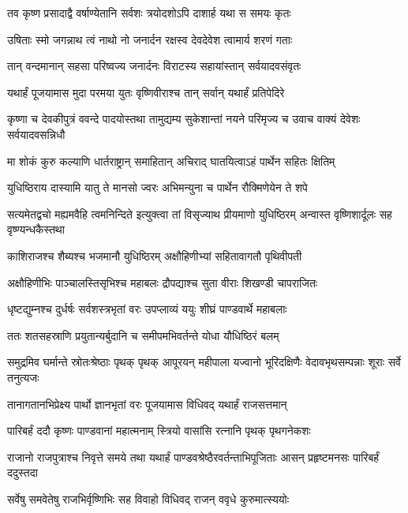 
\twolineshloka
{तव कृष्ण प्रसादाद्वै वर्षाण्येतानि सर्वशः}
{त्रयोदशोऽपि दाशार्ह यथा स समयः कृतः}


\twolineshloka
{उषिताः स्मो जगन्नाथ त्वं नाथो नो जनार्दन}
{रक्षस्व देवदेवेश त्वामार्य शरणं गताः}



\twolineshloka
{तान् वन्दमानान् सहसा परिष्वज्य जनार्दनः}
{विराटस्य सहायांस्तान् सर्वयादवसंवृतः}


\twolineshloka
{यथार्हं पूजयामास मुदा परमया युतः}
{वृष्णिवीराश्च तान् सर्वान् यथार्हं प्रतिपेदिरे}


\threelineshloka
{कृष्णा च देवकीपुत्रं ववन्दे पादयोस्तथा}
{तामुद्यम्य सुकेशान्तां नयने परिमृज्य च}
{उवाच वाक्यं देवेशः सर्वयादवसन्निधौ}


\twolineshloka
{मा शोकं कुरु कल्याणि धार्तराष्ट्रान् समाहितान्}
{अचिराद् घातयित्वाऽहं पार्थेन सहितः क्षितिम्}


\twolineshloka
{युधिष्ठिराय दास्यामि यातु ते मानसो ज्वरः}
{अभिमन्युना च पार्थेन रौक्मिणेयेन ते शपे}


\threelineshloka
{सत्यमेतद्वचो मह्यमवैहि त्वमनिन्दिते}
{इत्युक्त्वा तां विसृज्याथ प्रीयमाणो युधिष्ठिरम्}
{अन्वास्त वृष्णिशार्दूलः सह वृष्ण्यन्धकैस्तथा}


\twolineshloka
{काशिराजश्च शैब्यश्च भजमानौ युधिष्ठिरम्}
{अक्षौहिणीभ्यां सहितावागतौ पृथिवीपती}


\twolineshloka
{अक्षौहिणीभिः पाञ्चालस्तिसृभिश्च महाबलः}
{द्रौपद्याश्च सुता वीराः शिखण्डी चापराजितः}


\twolineshloka
{धृष्टद्युम्नश्च दुर्धर्षः सर्वशस्त्रभृतां वरः}
{उपप्लाव्यं ययुः शीघ्रं पाण्डवार्थे महाबलाः}


\twolineshloka
{ततः शतसहस्राणि प्रयुतान्यर्बुदानि च}
{समीपमभिवर्तन्ते योधा यौधिष्ठिरं बलम्}


\threelineshloka
{समुद्रमिव घर्मान्ते स्रोतःश्रेष्ठाः पृथक् पृथक्}
{आपूरयन् महीपाला यज्वानो भूरिदक्षिणैः}
{वेदावभृथसम्पन्नाः शूराः सर्वे तनुत्यजः}


\twolineshloka
{तानागतानभिप्रेक्ष्य पार्थो ज्ञानभृतां वरः}
{पूजयामास विधिवद् यथार्हं राजसत्तमान्}


\twolineshloka
{पारिबर्हं ददौ कृष्णः पाण्डवानां महात्मनाम्}
{स्त्रियो वासांसि रत्नानि पृथक् पृथगनेकशः}


\threelineshloka
{राजानो राजपुत्राश्च निवृत्ते समये तथा}
{यथार्हं पाण्डवश्रेष्ठैरवर्तन्ताभिपूजिताः}
{आसन् प्रहृष्टमनसः पारिबर्हं ददुस्तदा}


\twolineshloka
{सर्वेषु समवेतेषु राजभिर्वृष्णिभिः सह}
{विवाहो विधिवद् राजन् ववृधे कुरुमात्स्ययोः}


